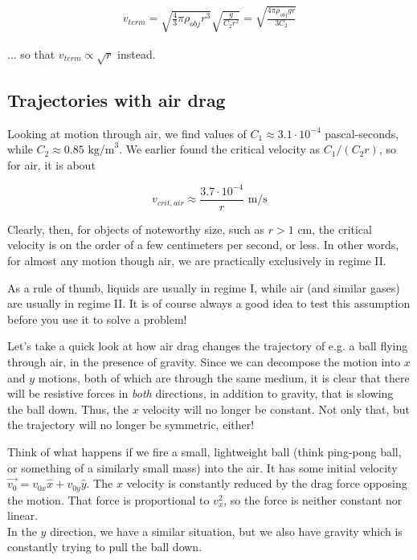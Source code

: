\begin{align}
v_{term} = \sqrt{\frac{4}{3} \pi \rho_{obj} r^3} \sqrt{\frac{ g}{C_2 r^2}} = \sqrt{\frac{4\pi \rho_{obj} g r}{3 C_2}}
\end{align}

... so that $v_{term} \propto \sqrt{r}$ instead.


\subsection{Trajectories with air drag}

Looking at motion through air, we find values of $C_1 \approx 3.1 \cdot 10^{-4}$ pascal-seconds, while $C_2 \approx 0.85 \text{ kg/m}^3$.
We earlier found the critical velocity as $C_1/(C_2 r)$, so for air, it is about 

\begin{equation}
v_{crit,air} \approx \frac{3.7 \cdot 10^{-4}}{r} \text{ m/s}
\end{equation}

Clearly, then, for objects of noteworthy size, such as $r > 1$ cm, the critical velocity is on the order of a few centimeters per second, or less. In other words, for almost any motion though air, we are practically exclusively in regime II.

As a rule of thumb, liquids are usually in regime I, while air (and similar gases) are usually in regime II. It is of course always a good idea to test this assumption before you use it to solve a problem!

Let's take a quick look at how air drag changes the trajectory of e.g. a ball flying through air, in the presence of gravity. Since we can decompose the motion into $x$ and $y$ motions, both of which are through the same medium, it is clear that there will be resistive forces in \emph{both} directions, in addition to gravity, that is slowing the ball down. Thus, the $x$ velocity will no longer be constant. Not only that, but the trajectory will no longer be symmetric, either!

Think of what happens if we fire a small, lightweight ball (think ping-pong ball, or something of a similarly small mass) into the air. It has some initial velocity $\vec{v_0} = v_{0x} \hat{x} + v_{0y} \hat{y}$. The $x$ velocity is constantly reduced by the drag force opposing the motion. That force is proportional to $v_x^2$, so the force is neither constant nor linear.\\
In the $y$ direction, we have a similar situation, but we also have gravity which is constantly trying to pull the ball down.

